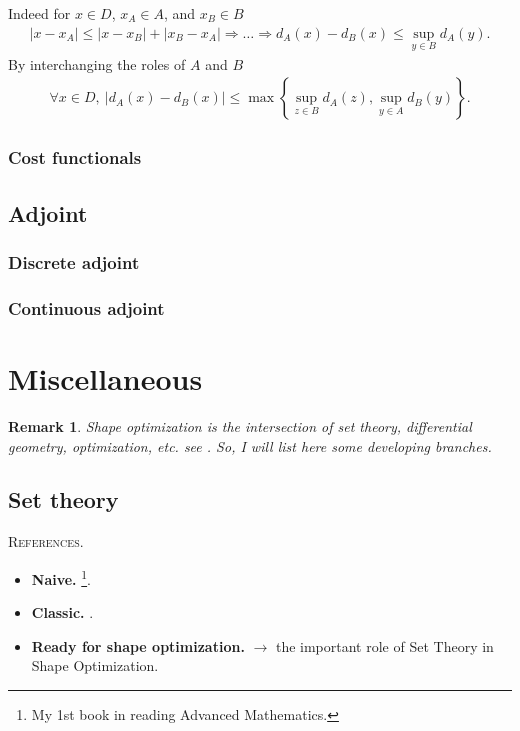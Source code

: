 \documentclass{book}
\numberwithin{equation}{section}
\newtheorem{remark}{Remark}[section]
\begin{document}
\begin{enumerate}
    Indeed for $x\in D$, $x_A\in A$, and $x_B\in B$
    \begin{align*}
        |x - x_A|\le|x - x_B| + |x_B - x_A|\Rightarrow\ldots\Rightarrow d_A(x) - d_B(x)\le\sup_{y\in B} d_A(y).
    \end{align*}
    By interchanging the roles of $A$ and $B$
    \begin{align*}
        \forall x\in D,\ |d_A(x) - d_B(x)|\le\max\left\{\sup_{z\in B} d_A(z),\sup_{y\in A} d_B(y)\right\}.
    \end{align*}
    
\end{enumerate}

\subsubsection{Cost functionals}

\subsection{Adjoint}

\subsubsection{Discrete adjoint}

\subsubsection{Continuous adjoint}

\section{Miscellaneous}

\begin{remark}
    Shape optimization is the intersection of set theory, differential geometry, optimization, etc. see \cite{Sturm2015}. So, I will list here some developing branches.
\end{remark}

\subsection{Set theory}
\textsc{References.}
\begin{itemize}
    \item \textbf{Naive.} \cite{Halmos1974}\footnote{My 1st book in reading Advanced Mathematics.}.
    \item \textbf{Classic.} \cite{Kaplansky1977}.
    \item \textbf{Ready for shape optimization.} \cite{Delfour_Zolesio2011} $\to$ the important role of Set Theory in Shape Optimization.
\end{itemize}
\end{document}
